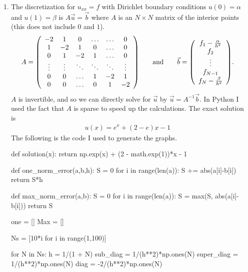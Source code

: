 \documentclass{article} %
\theoremstyle{plain}
\numberwithin{equation}{section} %
\numberwithin{figure}{section} %
\numberwithin{table}{section} %
\begin{document}
\begin{enumerate}[\ \ (a)]
    \item
        The discretization for $u_{xx} = f$ with Dirichlet boundary conditions $u(0) = \alpha$ and $u(1) = \beta$ is $A\vec{u} = \vec{b}$ where $A$ is an $N\times N$ matrix of the interior points (this does not include $0$ and $1$).
        \begin{align}
            A = \qty(\begin{array}{cccccc}
                -2 & 1 & 0 & \dots & \dots & 0 \\
                1 & -2 & 1 & 0 & \dots & 0 \\
                0 & 1 & -2 & 1 & \dots & 0 \\
                \vdots & \vdots & \ddots & \ddots & \ddots & \vdots \\
                0 & 0 & \dots & 1 & -2 & 1 \\
                0 & 0 & \dots & 0 & 1 & -2
            \end{array}) \qquad \text{and} \qquad \vec{b} = \qty(\begin{array}{c}
                f_1 - \frac{\alpha}{h^2} \\ f_2 \\ \vdots \\ f_{N-1} \\ f_N - \frac{\beta}{h^2}
            \end{array}).
        \end{align}
        $A$ is invertible, and so we can directly solve for $\vec{u}$ by $\vec{u} = A^{-1}\vec{b}$.  In Python I used the fact that $A$ is sparse to speed up the calculations.  The exact solution is
        \begin{align}
            u(x) = e^x + (2 - e)x - 1
        \end{align}
        The following is the code I used to generate the graphs.
        \begin{code}
def solution(x):
    return np.exp(x) + (2 - math.exp(1))*x - 1

def one_norm_error(a,b,h):
    S = 0
    for i in range(len(a)):
        S += abs(a[i]-b[i])
    return S*h

def max_norm_error(a,b):
    S = 0
    for i in range(len(a)):
        S = max(S, abs(a[i]-b[i]))
    return S

one = []
Max = []

Ns = [10*i for i in range(1,100)]

for N in Ns:
    h = 1/(1 + N)
    sub_diag = 1/(h**2)*np.ones(N)
    super_diag = 1/(h**2)*np.ones(N)
    diag = -2/(h**2)*np.ones(N)


\end{code}
\end{enumerate}
\end{document}
